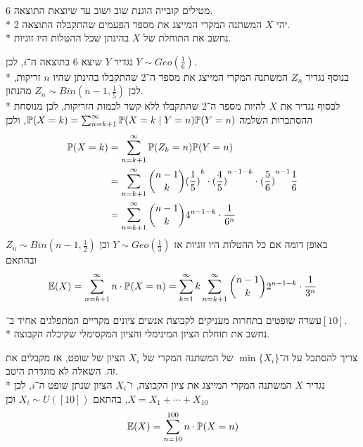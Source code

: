 \subquestion{}
מטילים קובייה הוגנת שוב ושוב עד שיוצאת התוצאה 6. \\*
יהי $X$ המשתנה המקרי המייצג את מספר הפעמים שהתקבלה התוצאה 2. \\*
נחשב את התוחלת של $X$ בהינתן שכל ההטלות היו זוגיות.
\begin{solution}
	נגדיר $Y$ שיצא 6 בתוצאה ה־$i$, לכן $Y \sim Geo(\frac{1}{6})$. \\*
	בנוסף נגדיר $Z_n$ המשתנה המקרי המייצג את מספר ה־2 שהתקבלו בהינתן שהיו $n$ זריקות, לכן $Z_n \sim Bin(n - 1, \frac{1}{5})$ מהנתון. \\*
	לבסוף נגדיר את $X$ להיות מספר ה־2 שהתקבלו ללא קשר לכמות הזריקות, לכן מנוסחת ההסתברות השלמה $\mathbb{P}(X = k) = \sum_{n = k + 1}^\infty \mathbb{P}(X = k \mid Y = n) \mathbb{P}(Y = n)$, ולכן
	\begin{align*}
		\mathbb{P}(X = k)
		& = \sum_{n = k + 1}^{\infty} \mathbb{P}(Z_k = n) \mathbb{P}(Y = n) \\
		& = \sum_{n = k + 1}^{\infty} \binom{n - 1}{k} {(\frac{1}{5})}^k \cdot {(\frac{4}{5})}^{n - 1 - k} \cdot {(\frac{5}{6})}^{n - 1} \frac{1}{6} \\
		& = \sum_{n = k + 1}^{\infty} \binom{n - 1}{k} 4^{n - 1 - k} \cdot \frac{1}{6^n}
	\end{align*}
	באופן דומה אם כל ההטלות היו זוגיות אז $Y \sim Geo(\frac{1}{3})$ וכן $Z_n \sim Bin(n - 1, \frac{1}{2})$ ובהתאם
	\[
		\mathbb{E}(X)
		= \sum_{n = k + 1}^{\infty} n \cdot \mathbb{P}(X = n)
		= \sum_{k = 1}^{\infty} k \sum_{n = k + 1}^{\infty} \binom{n - 1}{k} 2^{n - 1 - k} \cdot \frac{1}{3^n}
	\]
\end{solution}

\subquestion{}
עשרה שופטים בתחרות מעניקים לקבוצת אנשים ציונים מקריים המתפלגים אחיד ב־$[10]$. \\*
נחשב את תוחלת הציון המינימלי והציון המקסימלי שקיבלה הקבוצה.
\begin{solution}
	צריך להסתכל על ה־$\min\{ X_i \}$ של המשתנה המקרי של $X_i$ הציון של שופט, אז מקבלים את זה.
	השאלה לא מוגדרת היטב. \\*
	נגדיר $X$ המשתנה המקרי המייצג את ציון הקבוצה, ו־$X_i$ הציון שנתן שופט ה־$i$, לכן $X = X_1 + \cdots + X_{10}$, בהתאם $X_i \sim U([10])$ וכן
	\[
		\mathbb{E}(X) = \sum_{n = 10}^{100} n \cdot \mathbb{P}(X = n)
	\]
\end{solution}

